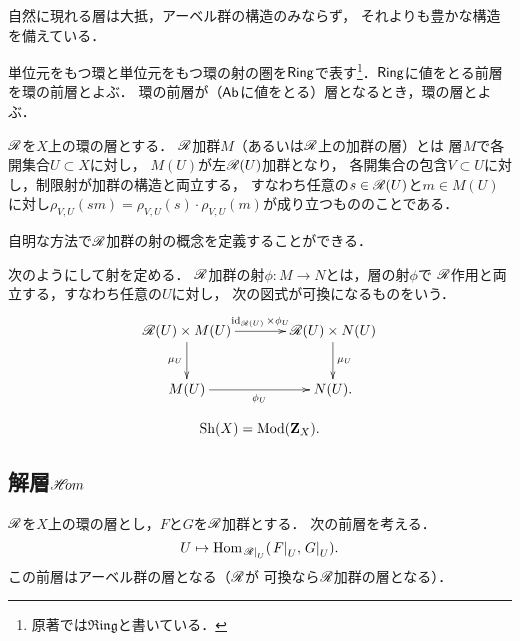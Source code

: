 自然に現れる層は大抵，アーベル群の構造のみならず，
それよりも豊かな構造を備えている．

単位元をもつ環と単位元をもつ環の射の圏を\(\Ring\)で表す\footnote{
    原著では\(\mathfrak{Ring}\)と書いている．
}．\(\Ring\)に値をとる前層を環の前層とよぶ．
環の前層が（\(\cAb\)に値をとる）層となるとき，環の層とよぶ．

\begin{DFN}
    \(\scR\)を\(X\)上の環の層とする．
    \(\scR\)加群\(M\)（あるいは\(\scR\)上の加群の層）とは
    層\(M\)で各開集合\(U\subset X\)に対し，
    \(M(U)\)が左\(\scR(U)\)加群となり，
    各開集合の包含\(V\subset U\)に対し，制限射が加群の構造と両立する，
    すなわち任意の\(s\in\scR(U)\)と\(m\in M(U)\)に対し\(
        \rho_{V,U}(sm)=\rho_{V,U}(s)\cdot\rho_{V,U}(m)
    \)が成り立つもののことである．
\end{DFN}

自明な方法で\(\scR\)加群の射の概念を定義することができる．

\begin{CMT*}
    次のようにして射を定める．
    \(\scR\)加群の射\(\phi\colon M\to N\)とは，層の射\(\phi\)で
    \(\scR\)作用と両立する，すなわち任意の\(U\)に対し，
    次の図式が可換になるものをいう．
    \[\vcenter{\xymatrix@C=36pt@R=26pt{
    \scR(U)\times M(U)
    \ar[r]^-{\id_{\scR(U)}\times\phi_U}
    \ar[d]_-{\mu_{U}}
    &
    \scR(U)\times N(U)\ar[d]^-{\mu_{U}} 
    \\
    M(U)\ar[r]_-{\phi_U}
    &
    N(U).
    }}\]
\end{CMT*}
\begin{equation}
    \Sh(X)=\Mod(\zz_X).
\end{equation}
\subsection*{解層\(\HOM\)}
\(\scR\)を\(X\)上の環の層とし，\(F\)と\(G\)を\(\scR\)加群とする．
次の前層を考える．
\begin{equation}\label{eq224}
    U\mapsto \Hom_{\mres[\scR]{U}}(\mres[F]{U},\mres[G]{U}).
\end{equation}
この前層はアーベル群の層となる（\(\scR\)が
可換なら\(\scR\)加群の層となる）．

